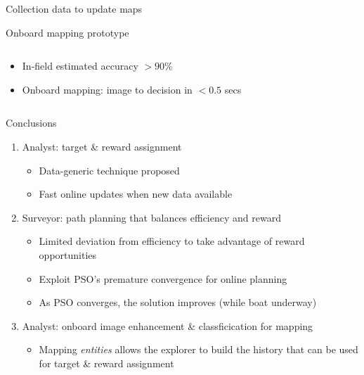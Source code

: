 \documentclass[9pt,xcolor=table]{beamer}
\begin{document}
\begin{frame}{Collection data to update maps}
\begin{block}{Onboard mapping prototype}
\begin{enumerate}
\begin{columns}
\begin{column}{0.7\textwidth}
\begin{itemize}
                    \item In-field estimated accuracy $>90\%$
                    \item Onboard mapping: image to decision in $<0.5$ secs
                \end{itemize}
            \end{column}
        \end{columns}  
        \end{enumerate}
    \end{block}
\end{frame}
\begin{frame}{Conclusions}
    \begin{enumerate}
      \setlength\itemsep{2em}
        \item Analyst: target \& reward assignment
        \begin{itemize}
            \item Data-generic technique proposed
            \item Fast online updates when new data available
        \end{itemize}
        \item Surveyor: path planning that balances efficiency and reward
        \begin{itemize}
            \item Limited deviation from efficiency to take advantage of reward opportunities
            \item Exploit PSO's premature convergence for online planning
            \item As PSO converges, the solution improves (while boat underway)
        \end{itemize}
        \item Analyst: onboard image enhancement \& classficication for mapping
        \begin{itemize}
            \item Mapping \textit{entities} allows the explorer to build the history that can be used for target \& reward assignment
        \end{itemize}
    \end{enumerate}
\end{frame}
\end{document}
